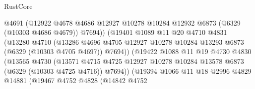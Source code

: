 \begin{lexlean}{RustCore}
\begin{coremodule}
                                  @4691
                                  (@12922
                                    @4678
                                    @4686
                                    @12927
                                    @10278
                                    @10284
                                    @12932
                                    @6873
                                    (@6329 (@10303 @4686 @4679))
                                    @7694))
                                (@19401
                                  @1089
                                  @11
                                  @20
                                  @4710
                                  @4831
                                  (@13280
                                    @4710
                                    (@13286
                                      @4696
                                      @4705
                                      @12927
                                      @10278
                                      @10284
                                      @13293
                                      @6873
                                      (@6329 (@10303 @4705 @4697))
                                      @7694))
                                  (@19422
                                    @1088
                                    @11
                                    @19
                                    @4730
                                    @4830
                                    (@13565
                                      @4730
                                      (@13571
                                        @4715
                                        @4725
                                        @12927
                                        @10278
                                        @10284
                                        @13578
                                        @6873
                                        (@6329 (@10303 @4725 @4716))
                                        @7694))
                                    (@19394
                                      @1066
                                      @11
                                      @18
                                      @2996
                                      @4829
                                      @14881
                                      (@19467
                                        @4752
                                        @4828
                                        (@14842
                                          @4752

\end{coremodule}
\end{lexlean}
